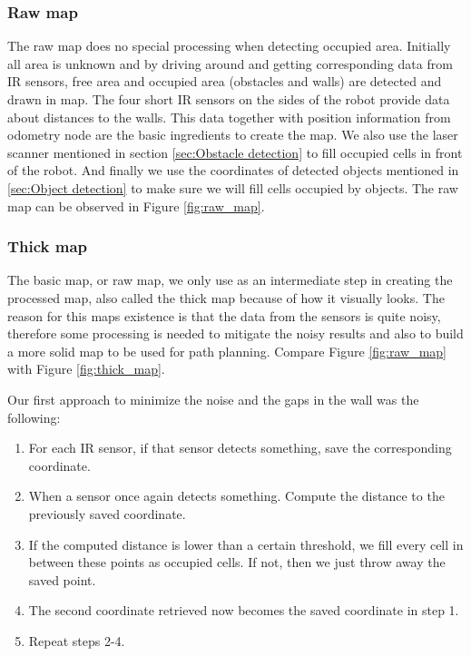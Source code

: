 \subsubsection{Raw map}
The raw map does no special processing when detecting occupied area. Initially all area is unknown and by driving around and getting corresponding data from IR sensors, free area and occupied area (obstacles and walls) are detected and drawn in map. The four short IR sensors on the sides of the robot provide data about distances to the walls. This data together with position information from odometry node are the basic ingredients to create the map.
We also use the laser scanner mentioned in section \ref{sec:Obstacle detection} to fill occupied cells in front of the robot. And finally we use the coordinates of detected objects mentioned in \ref{sec:Object detection} to make sure we will fill cells occupied by objects. The raw map can be observed in Figure \ref{fig:raw_map}.


\subsubsection{Thick map}
The basic map, or raw map, we only use as an intermediate step in creating the processed map, also called the thick map because of how it visually looks. The reason for this maps existence is that the data from the sensors is quite noisy, therefore some processing is needed to mitigate the noisy results and also to build a more solid map to be used for path planning. Compare Figure \ref{fig:raw_map} with Figure \ref{fig:thick_map}.

Our first approach to minimize the noise and the gaps in the wall was the following:

\begin{enumerate}
\item For each IR sensor, if that sensor detects something, save the corresponding coordinate.
\item When a sensor once again detects something. Compute the distance to the previously saved coordinate.
\item If the computed distance is lower than a certain threshold, we fill every cell in between these points as occupied cells. If not, then we just throw away the saved point.
\item The second coordinate retrieved now becomes the saved coordinate in step 1.
\item Repeat steps 2-4.
\end{enumerate}

